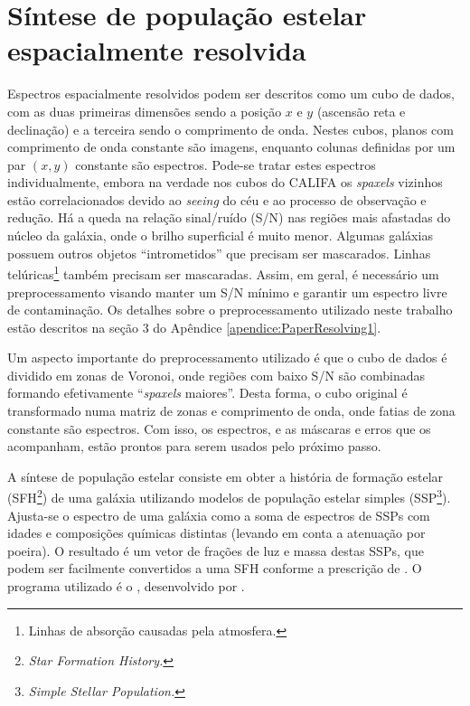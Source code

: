 
\section{Síntese de população estelar espacialmente resolvida}
\label{sec:Intro:Sintese}

Espectros espacialmente resolvidos podem ser descritos como um cubo de dados,
com as duas primeiras dimensões sendo a posição $x$ e $y$ (ascensão reta e
declinação) e a terceira sendo o comprimento de onda. Nestes cubos, planos com
comprimento de onda constante são imagens, enquanto colunas definidas por um par
$(x, y)$ constante são espectros. Pode-se tratar estes espectros
individualmente, embora na verdade nos cubos do CALIFA os {\em spaxels}
vizinhos estão correlacionados devido ao {\em seeing} do céu e ao processo de
observação e redução. Há a queda na relação sinal/ruído (S/N) nas regiões mais
afastadas do núcleo da galáxia, onde o brilho superficial é muito menor.
Algumas galáxias possuem outros objetos ``intrometidos'' que precisam ser
mascarados. Linhas telúricas\footnote{Linhas de absorção causadas pela
atmosfera.} também precisam ser mascaradas. Assim, em geral, é necessário um
preprocessamento visando manter um S/N mínimo e garantir um espectro livre de
contaminação. Os detalhes sobre o preprocessamento utilizado neste trabalho
estão descritos na seção 3 do Apêndice \ref{apendice:PaperResolving1}.

Um aspecto importante do preprocessamento utilizado é que o cubo de dados é
dividido em zonas de Voronoi, onde regiões com baixo S/N são combinadas formando
efetivamente ``{\em spaxels} maiores''. Desta forma, o cubo original é
transformado numa matriz de zonas e comprimento de onda, onde fatias de zona
constante são espectros. Com isso, os espectros, e as máscaras e erros que os
acompanham, estão prontos para serem usados pelo próximo passo.

A síntese de população estelar consiste em obter a história de formação estelar
(SFH\footnote{\em Star Formation History.}) de uma galáxia utilizando modelos de
população estelar simples (SSP\footnote{\em Simple Stellar Population.}).
Ajusta-se o espectro de uma galáxia como a soma de espectros de SSPs com idades
e composições químicas distintas (levando em conta a atenuação por poeira). O
resultado é um vetor de frações de luz e massa destas SSPs, que podem ser
facilmente convertidos a uma SFH conforme a prescrição de \cite{Asari2007}.
O programa utilizado é o \starlight, desenvolvido por \cite{CidFernandes2005}.

